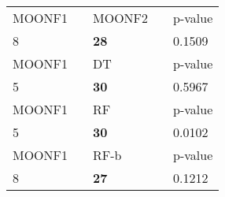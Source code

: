 \begin{tabular}{ l l l l l}
\midrule
{MOONF1} & & {MOONF2} & & {p-value}\\
8 & & \textbf{28} & & 0.1509\\
\midrule
{MOONF1} & & {DT} & & {p-value}\\
5 & & \textbf{30} & & 0.5967\\
\midrule
{MOONF1} & & {RF} & & {p-value}\\
5 & & \textbf{30} & & 0.0102\\
\midrule
{MOONF1} & & {RF-b} & & {p-value}\\
8 & & \textbf{27} & & 0.1212\\
\midrule
\end{tabular}
